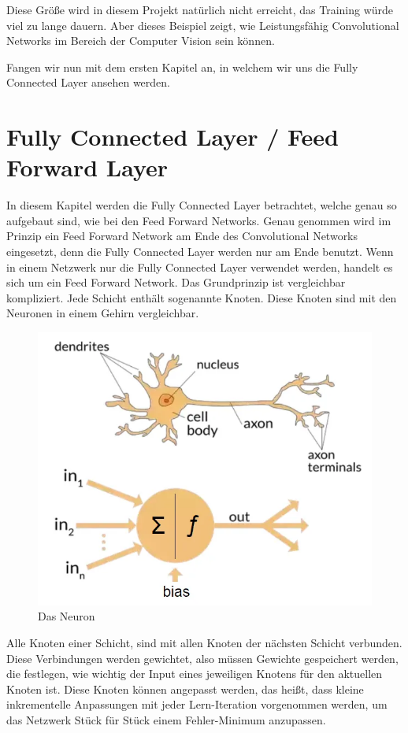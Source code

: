 \documentclass[12pt]{article}
\begin{document}
Diese Größe wird in diesem Projekt natürlich nicht erreicht, das Training würde viel zu lange dauern. Aber dieses Beispiel zeigt, wie Leistungsfähig Convolutional Networks im Bereich der Computer Vision sein können. 

Fangen wir nun mit dem ersten Kapitel an, in welchem wir uns die Fully Connected Layer ansehen werden.

\cleardoublepage
\section{Fully Connected Layer / Feed Forward Layer}
In diesem Kapitel werden die Fully Connected Layer betrachtet, welche genau so aufgebaut sind, wie bei den Feed Forward Networks. Genau genommen wird im Prinzip ein Feed Forward Network am Ende des Convolutional Networks eingesetzt, denn die Fully Connected Layer werden nur am Ende benutzt. Wenn in einem Netzwerk nur die Fully Connected Layer verwendet werden, handelt es sich um ein Feed Forward Network. 
Das Grundprinzip ist vergleichbar kompliziert. Jede Schicht enthält sogenannte Knoten. Diese Knoten sind mit den Neuronen in einem Gehirn vergleichbar.

\begin{figure}[H]
\centering
\includegraphics[scale=0.40]{./Images/BA_001_DasNeuron.png}
\caption{Das Neuron}
\label{Das Neuron}
\end{figure}

Alle Knoten einer Schicht, sind mit allen Knoten der nächsten Schicht verbunden. Diese Verbindungen werden gewichtet, also müssen Gewichte gespeichert werden, die festlegen, wie wichtig der Input eines jeweiligen Knotens für den aktuellen Knoten ist. Diese Knoten können angepasst werden, das heißt, dass kleine inkrementelle Anpassungen mit jeder Lern-Iteration vorgenommen werden, um das Netzwerk Stück für Stück einem Fehler-Minimum anzupassen. 
\end{document}
